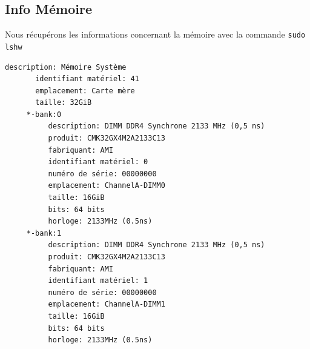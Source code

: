 \documentclass[11pt]{article}
\theoremstyle{definition}
\theoremstyle{definition}
\theoremstyle{definition}
\begin{document}
\subsection {Info Mémoire}
Nous récupérons les informations concernant la mémoire avec la commande \texttt{sudo lshw}
\begin{lstlisting}[columns=fixed,basicstyle=\scriptsize\ttfamily]
 description: Mémoire Système
       identifiant matériel: 41
       emplacement: Carte mère
       taille: 32GiB
     *-bank:0
          description: DIMM DDR4 Synchrone 2133 MHz (0,5 ns)
          produit: CMK32GX4M2A2133C13
          fabriquant: AMI
          identifiant matériel: 0
          numéro de série: 00000000
          emplacement: ChannelA-DIMM0
          taille: 16GiB
          bits: 64 bits
          horloge: 2133MHz (0.5ns)
     *-bank:1
          description: DIMM DDR4 Synchrone 2133 MHz (0,5 ns)
          produit: CMK32GX4M2A2133C13
          fabriquant: AMI
          identifiant matériel: 1
          numéro de série: 00000000
          emplacement: ChannelA-DIMM1
          taille: 16GiB
          bits: 64 bits
          horloge: 2133MHz (0.5ns)
\end{lstlisting}
\end{document}
